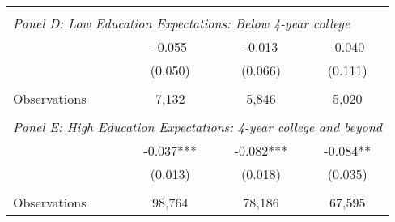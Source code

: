 {\begin{tabular}{lccc}
&  &  &   \\
\multicolumn{4}{l}{\textit{Panel D: Low Education Expectations: Below 4-year college}} \\
\hspace{3mm}        &      -0.055   &      -0.013   &      -0.040   \\
                    &     (0.050)   &     (0.066)   &     (0.111)   \\
                    &               &               &               \\
\hspace{3mm}Observations&       7,132   &       5,846   &       5,020   \\
 
&  &  &   \\
\multicolumn{4}{l}{\textit{Panel E: High Education Expectations: 4-year college and beyond}} \\
\hspace{3mm}        &      -0.037***&      -0.082***&      -0.084** \\
                    &     (0.013)   &     (0.018)   &     (0.035)   \\
                    &               &               &               \\
\hspace{3mm}Observations&      98,764   &      78,186   &      67,595   \\
 

\bottomrule
\end{tabular}
}
